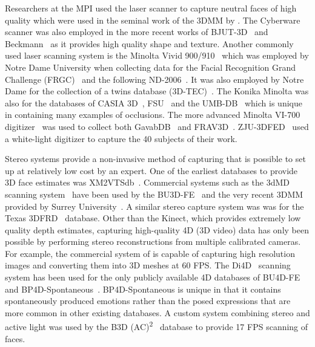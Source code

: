 Researchers at the MPI used the \citet{cyberware} laser scanner to capture
neutral faces of high quality which were used in the seminal work of the 3DMM
by \citet{RefWorks:96}. The Cyberware scanner was also employed in the more 
recent works of BJUT-3D~\cite{baocai2009bjut} and Beckmann~\cite{hu2007building}
as it provides high quality shape and texture. Another commonly used
laser scanning system is the Minolta Vivid 900/910~\cite{minolta} which was
employed by Notre Dame University when collecting data for the Facial
Recognition Grand Challenge (FRGC)~\cite{phillips2005overview} and the following
ND-2006~\cite{faltemier2007using}. It was also employed by Notre Dame for the
collection of a twins database (3D-TEC)~\cite{vijayan2011twins}. 
The Konika Minolta was also for the databases of CASIA 3D~\cite{casia3d},
FSU~\cite{hesher2003novel} and the UMB-DB~\cite{colombo2011umb} which is unique
in containing many examples of occlusions. The more advanced
Minolta VI-700 digitizer~\cite{minolta} was used to collect both
GavabDB~\cite{moreno2004gavabdb} and FRAV3D~\cite{conde2006multimodal}.
ZJU-3DFED~\cite{wang2006exploring} used a white-light digitizer to capture
the 40 subjects of their work. 

Stereo systems provide a non-invasive method of capturing that is possible
to set up at relatively low cost by an expert. One of the earliest databases
to provide 3D face estimates was XM2VTSdb~\cite{messer1999xm2vtsdb}. 
Commercial systems such as
the 3dMD scanning system~\cite{3dmd} have been used by the 
BU3D-FE~\cite{Yin:2006cc} and the very recent 3DMM provided by 
Surrey University~\cite{Huber:F5Dca9zy}. A similar stereo capture
system was was for the Texas 3DFRD~\cite{gupta2010anthropometric} database.
Other than the Kinect,
which provides extremely low quality depth estimates, capturing high-quality 4D
(3D video) data has only been possible by performing stereo reconstructions from
multiple calibrated cameras. For example, the commercial system of \citet{di4d}
is capable of capturing high resolution images and converting them into
3D meshes at 60 FPS. The Di4D~\cite{di4d} scanning system has been used for
the only publicly available 4D databases of BU4D-FE~\cite{yin2008high} and
BP4D-Spontaneous~\cite{Zhang:2014id}. BP4D-Spontaneous is unique in that it
contains spontaneously produced emotions rather than the posed expressions
that are more common in other existing databases. A custom system combining
stereo and active light was used by the 
B3D (AC)\textsuperscript{2}~\cite{weise2007fast,fanelli2013random} database to
provide 17 FPS scanning of faces.

